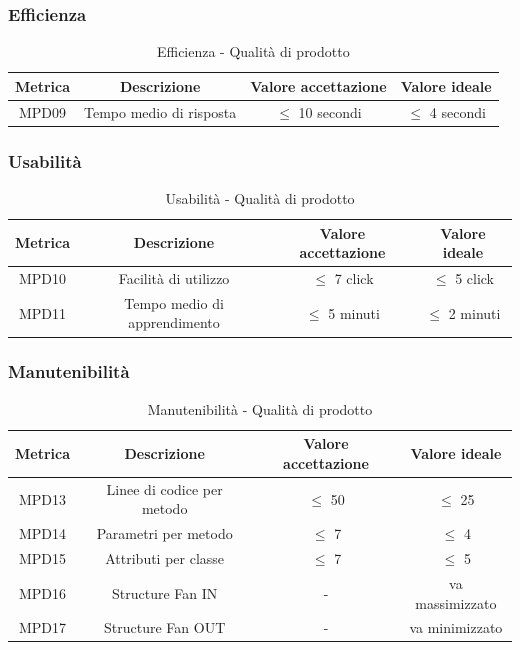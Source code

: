 \documentclass[10pt]{article}
\begin{document}
\begin{justify}
\subsubsection{Efficienza}
\begin{table}[H]
  \centering
\begin{tabular}{|c|c|c|c|}
  \hline
  \textbf{Metrica} & \textbf{Descrizione} & \textbf{Valore accettazione} & \textbf{Valore ideale}\\
  \hline
  MPD09 & Tempo medio di risposta & $\leq$ 10 secondi & $\leq$ 4 secondi \\
  \hline
\end{tabular}
\caption{Efficienza - Qualità di prodotto}
\label{tab:efficienza}
\end{table}

\subsubsection{Usabilità}
\begin{table}[H]
  \centering
\begin{tabular}{|c|c|c|c|}
  \hline
  \textbf{Metrica} & \textbf{Descrizione} & \textbf{Valore accettazione} & \textbf{Valore ideale}\\
  \hline
  MPD10 & Facilità di utilizzo & $\leq$ 7 click & $\leq$ 5 click\\
  \hline
  MPD11 & Tempo medio di apprendimento & $\leq$ 5 minuti & $\leq$ 2 minuti \\
  \hline
\end{tabular}
\caption{Usabilità - Qualità di prodotto}
\label{tab:usabilità}
\end{table}

\subsubsection{Manutenibilità}
\begin{table}[H]
  \centering
\begin{tabular}{|c|c|c|c|}
  \hline
  \textbf{Metrica} & \textbf{Descrizione} & \textbf{Valore accettazione} & \textbf{Valore ideale}\\
  \hline
  MPD13 & Linee di codice per metodo & $\leq$ 50 & $\leq$ 25 \\
  \hline
  MPD14 & Parametri per metodo & $\leq$ 7 & $\leq$ 4 \\
  \hline
  MPD15 & Attributi per classe & $\leq$ 7 & $\leq$ 5 \\
  \hline
  MPD16 & Structure Fan IN & - & va massimizzato \\
  \hline
  MPD17 & Structure Fan OUT & - & va minimizzato \\
  \hline
\end{tabular}
\caption{Manutenibilità - Qualità di prodotto}
\label{tab:manutenibilità}
\end{table}


\end{justify}
\end{document}
